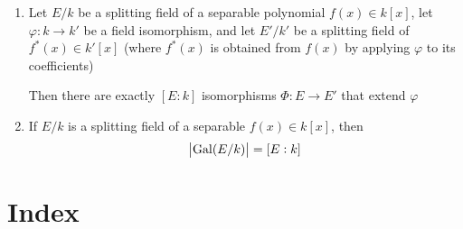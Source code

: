 \documentclass[11pt]{article}
\begin{document}
\begin{theorem}[]
\begin{enumerate}
\item Let \(E/k\) be a splitting field of a separable polynomial
\(f(x)\in k[x]\), let \(\varphi:k\to k'\) be a field isomorphism, and let 
\(E'/k'\) be a splitting field of \(f^*(x)\in k'[x]\) (where \(f^*(x)\) is
obtained from \(f(x)\) by applying \(\varphi\) to its coefficients)
\begin{center}
\end{center}
Then there are exactly \([E:k]\) isomorphisms \(\Phi:E\to E'\) that extend \(\varphi\)
\item If \(E/k\) is a splitting field of a separable \(f(x)\in k[x]\), then
\begin{equation*}
\abs{\operatorname{Gal}(E/k)}=[E:k]
\end{equation*}
\end{enumerate}
\end{theorem}

\section{Index}
\label{sec:orga76cbff}
\renewcommand{\indexname}{}
\printindex
\end{document}
